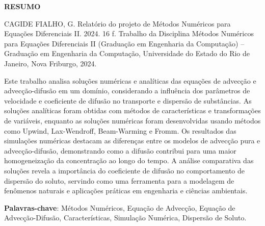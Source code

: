 \begin{titlepage}
    \thispagestyle{empty} %

    \begin{center}
        \textbf{\Large RESUMO}
    \end{center}

    \vspace{1cm} %

    \noindent CAGIDE FIALHO, G. Relatório do projeto de Métodos Numéricos para Equações Diferenciais II. 2024. 16 f. Trabalho da Disciplina Métodos Numéricos para Equações Diferenciais II (Graduação em Engenharia da Computação) – Graduação em Engenharia da Computação, Universidade do Estado do Rio de Janeiro, Nova Friburgo, 2024.

    \vspace{0.4cm} %

    Este trabalho analisa soluções numéricas e analíticas das equações de advecção e advecção-difusão em um domínio, considerando a influência dos parâmetros de velocidade e coeficiente de difusão no transporte e dispersão de substâncias. As soluções analíticas foram obtidas com métodos de características e transformações de variáveis, enquanto as soluções numéricas foram desenvolvidas usando métodos como Upwind, Lax-Wendroff, Beam-Warming e Fromm. Os resultados das simulações numéricas destacam as diferenças entre os modelos de advecção pura e advecção-difusão, demonstrando como a difusão contribui para uma maior homogeneização da concentração ao longo do tempo. A análise comparativa das soluções revela a importância do coeficiente de difusão no comportamento de dispersão do soluto, servindo como uma ferramenta para a modelagem de fenômenos naturais e aplicações práticas em engenharia e ciências ambientais.

    \vspace{0.4cm} %

    \textbf{Palavras-chave}: Métodos Numéricos, Equação de Advecção, Equação de Advecção-Difusão, Características, Simulação Numérica, Dispersão de Soluto.
\end{titlepage}
